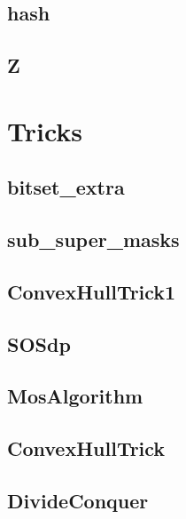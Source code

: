 \subsection{hash}
\raggedbottom
\hrulefill
\subsection{Z}
\raggedbottom
\hrulefill

\section{Tricks}
\subsection{bitset_extra}
\raggedbottom
\hrulefill
\subsection{sub_super_masks}
\raggedbottom
\hrulefill
\subsection{ConvexHullTrick1}
\raggedbottom
\hrulefill
\subsection{SOSdp}
\raggedbottom
\hrulefill
\subsection{MosAlgorithm}
\raggedbottom
\hrulefill
\subsection{ConvexHullTrick}
\raggedbottom
\hrulefill
\subsection{DivideConquer}
\raggedbottom
\hrulefill

